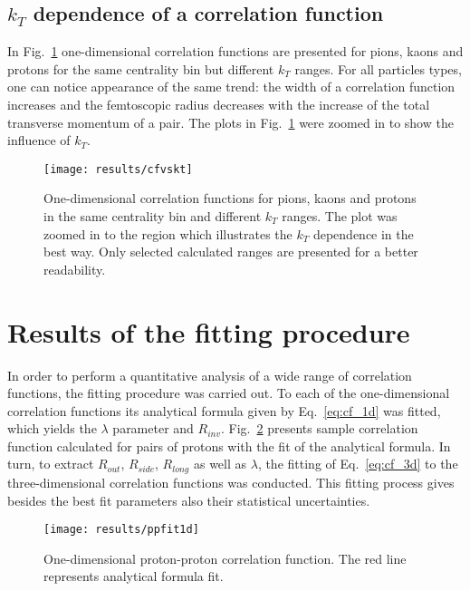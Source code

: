     \subsection{$k_T$ dependence of a correlation function}
      In Fig.~\ref{fig:kt_dep} one-dimensional correlation functions are presented for pions, kaons and protons for the same centrality bin but different $k_T$ ranges.
      For all particles types, one can notice appearance of the same trend: the width of a correlation function increases and the femtoscopic radius decreases with the increase of the total transverse momentum of a pair.
      The plots in Fig.~\ref{fig:kt_dep} were zoomed in to show the influence of $k_T$.

      \begin{figure}[h]
        \centering
        \centerline{\texttt{[image: results/cfvskt]}}
        \caption{One-dimensional correlation functions for pions, kaons and protons in the same centrality bin and different $k_T$ ranges. The plot was zoomed in to the region which illustrates the $k_T$ dependence in the best way. Only selected calculated ranges are presented for a better readability.}
      \label{fig:kt_dep}
      \end{figure}
    \FloatBarrier
    \clearpage
  \section{Results of the fitting procedure}
    In order to perform a quantitative analysis of a wide range of correlation functions, the fitting procedure was carried out.
    To each of the one-dimensional correlation functions its analytical formula given by Eq.~\ref{eq:cf_1d} was fitted, which yields the $\lambda$ parameter and $R_{inv}$.
    Fig.~\ref{fig:ppfit} presents sample correlation function calculated for pairs of protons with the fit of the analytical formula.
    In turn, to extract $R_{out}$, $R_{side}$, $R_{long}$ as well as $\lambda$, the fitting of Eq.~\ref{eq:cf_3d} to the three-dimensional correlation functions was conducted.
    This fitting process gives besides the best fit parameters also their statistical uncertainties.
    \begin{figure}[h]
      \centering
      \centerline{\texttt{[image: results/ppfit1d]}}
      \caption{One-dimensional proton-proton correlation function. The red line represents analytical formula fit.}
    \label{fig:ppfit}
    \end{figure}

